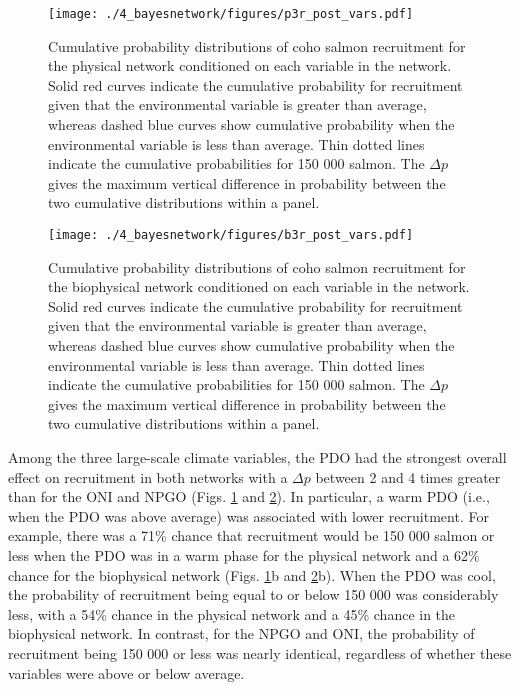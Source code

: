 \begin{figure}[htbp]
  \centering \texttt{[image: ./4\_bayesnetwork/figures/p3r\_post\_vars.pdf]}
  \caption[Cumulative probability distributions of coho salmon recruitment for
           the physical network conditioned on each variable in the
           network.]{Cumulative probability distributions of coho salmon
           recruitment for the physical network conditioned on each variable in
           the network. Solid red curves indicate the cumulative probability
           for recruitment given that the environmental variable is greater than
           average, whereas dashed blue curves show cumulative probability when
           the environmental variable is less than average. Thin dotted lines
           indicate the cumulative probabilities for 150 000 salmon. The
           \(\Delta p\) gives the maximum vertical difference in probability
           between the two cumulative distributions within a panel.}
  \label{fig:bn:6}
\end{figure}

\begin{figure}[htbp]
  \centering \texttt{[image: ./4\_bayesnetwork/figures/b3r\_post\_vars.pdf]}
  \caption[Cumulative probability distributions of coho salmon recruitment for
           the biophysical network conditioned on each variable in the
           network.]{Cumulative probability distributions of coho salmon
           recruitment for the biophysical network conditioned on each variable
           in the network. Solid red curves indicate the cumulative probability
           for recruitment given that the environmental variable is greater than
           average, whereas dashed blue curves show cumulative probability when
           the environmental variable is less than average. Thin dotted lines
           indicate the cumulative probabilities for 150 000 salmon. The
           \(\Delta p\) gives the maximum vertical difference in probability
           between the two cumulative distributions within a panel.}
  \label{fig:bn:7}
\end{figure}

Among the three large-scale climate variables, the PDO had the strongest overall
effect on recruitment in both networks with a \(\Delta p\) between 2 and 4 times
greater than for the ONI and NPGO (Figs. \ref{fig:bn:6} and \ref{fig:bn:7}). In
particular, a warm PDO (i.e., when the PDO was above average) was associated
with lower recruitment. For example, there was a 71\% chance that recruitment
would be 150 000 salmon or less when the PDO was in a warm phase for the
physical network and a 62\% chance for the biophysical network (Figs.
\ref{fig:bn:6}b and \ref{fig:bn:7}b). When the PDO was cool, the probability of
recruitment being equal to or below 150 000 was considerably less, with a 54\%
chance in the physical network and a 45\% chance in the biophysical network. In
contrast, for the NPGO and ONI, the probability of recruitment being 150 000 or
less was nearly identical, regardless of whether these variables were above or
below average.

